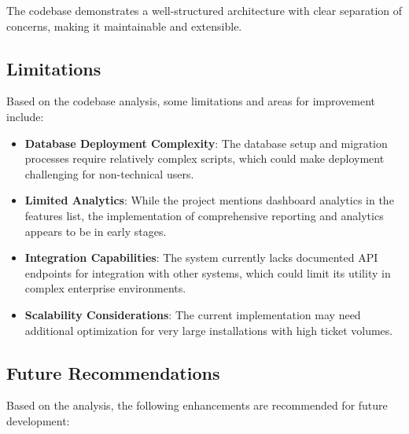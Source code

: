 \documentclass[12pt,a4paper]{article}
\begin{document}
The codebase demonstrates a well-structured architecture with clear separation of concerns, making it maintainable and extensible.

\subsection{Limitations}

Based on the codebase analysis, some limitations and areas for improvement include:

\begin{itemize}
    \item \textbf{Database Deployment Complexity}: The database setup and migration processes require relatively complex scripts, which could make deployment challenging for non-technical users.
    
    \item \textbf{Limited Analytics}: While the project mentions dashboard analytics in the features list, the implementation of comprehensive reporting and analytics appears to be in early stages.
    
    \item \textbf{Integration Capabilities}: The system currently lacks documented API endpoints for integration with other systems, which could limit its utility in complex enterprise environments.
    
    \item \textbf{Scalability Considerations}: The current implementation may need additional optimization for very large installations with high ticket volumes.
\end{itemize}

\subsection{Future Recommendations}

Based on the analysis, the following enhancements are recommended for future development:
\end{document}
